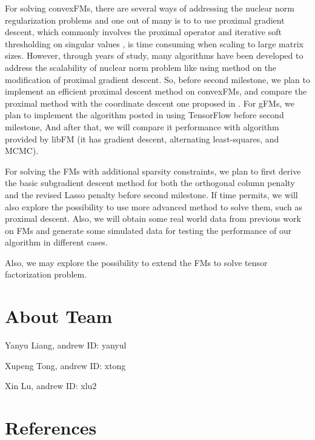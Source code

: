 \documentclass{article}
\begin{document}
For solving convexFMs, there are several ways of addressing the nuclear norm regularization problems and one out of many is to to use proximal gradient descent, which commonly involves the proximal operator and iterative soft thresholding on singular values \cite{lu3}, is time consuming when scaling to large matrix sizes. However, through years of study, many algorithms have been developed to address the scalability of nuclear norm problem like \cite{lu4} using method on the modification of proximal gradient descent. So, before second milestone, we plan to implement an efficient proximal descent method on convexFMs, and compare the proximal method with the coordinate descent one proposed in \cite{lu2}. For gFMs, we plan to implement the algorithm posted in \cite{lin2016non} using TensorFlow before second milestone, And after that, we will compare it performance with algorithm provided by libFM \cite{rendle2012factorization} (it has gradient descent, alternating least-squares, and MCMC).


For solving the FMs with additional sparsity constraints, we plan to first derive the basic subgradient descent method for both the orthogonal column penalty and the revised Lasso penalty before second milestone. If time permits, we will also explore the possibility to use more advanced method to solve them, such as proximal descent. Also, we will obtain some real world data from previous work on FMs and generate some simulated data for testing the performance of our algorithm in different cases.

Also, we may explore the possibility to extend the FMs to solve tensor factorization problem.

\section{About Team}

Yanyu Liang, andrew ID: yanyul

Xupeng Tong, andrew ID: xtong

Xin Lu, andrew ID: xlu2


\section*{References}
\small{
\renewcommand{\section}[2]{}%
 

}
\end{document}

